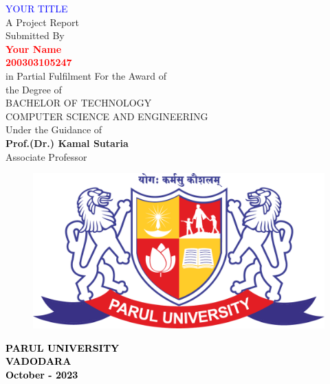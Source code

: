 \thispagestyle{empty}
\begin{center}
\textcolor{blue}{{\huge \textsc{YOUR TITLE} }}\\
\vspace{1cm}
A Project Report \\
\vspace{0.3cm}
Submitted By\\

\textcolor{red}{{\huge \bf Your Name}\\ 
{\bf 200303105247}}\\ 

\vspace{0.4cm}
in Partial Fulfilment For the Award of\\
the Degree of\\
BACHELOR OF TECHNOLOGY\\
COMPUTER SCIENCE AND ENGINEERING\\
Under the Guidance of\\
\large{\textbf{Prof.(Dr.) Kamal Sutaria}}\\
Associate Professor\\

\vspace{0.3cm}
\begin{figure}[h]
\begin{center}
     \includegraphics[scale=0.1]{parullogo.png}
\end{center}
\end{figure}
\textcolor{black}{\textbf{\large{PARUL UNIVERSITY}\\
VADODARA\\
October - 2023}}
\end{center}
